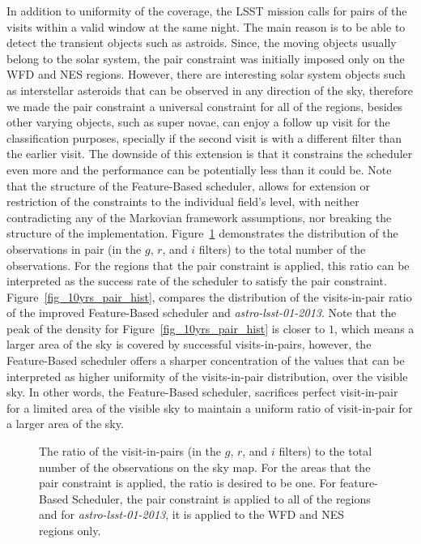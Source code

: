 \documentclass[12pt]{aastex62}
\theoremstyle{definition}
\begin{document}
In addition to uniformity of the coverage, the LSST mission calls for pairs of the visits within a valid window at the same night. The main reason is to be able to detect the transient objects such as astroids. Since, the moving objects usually belong to the solar system, the pair constraint was initially imposed only on the WFD and NES regions. However, there are interesting solar system objects such as interstellar asteroids that can be observed in any direction of the sky, therefore we made the pair constraint a universal constraint for all of the regions, besides other varying objects, such as super novae, can enjoy a follow up visit for the classification purposes, specially if the second visit is with a different filter than the earlier visit. The downside of this extension is that it constrains the scheduler even more and the performance can be potentially less than it could be. Note that the structure of the Feature-Based scheduler, allows for extension or restriction of the constraints to the individual field's level, with neither contradicting any of the Markovian framework assumptions, nor breaking the structure of the implementation. Figure~\ref{fig_10yrs_pair} demonstrates the distribution of the observations in pair (in the $g$, $r$, and $i$ filters) to the total number of the observations. For the regions that the pair constraint is applied, this ratio can be interpreted as the success rate of the scheduler to satisfy the pair constraint. Figure~\ref{fig_10yrs_pair_hist}, compares the distribution of the visits-in-pair ratio of the improved Feature-Based scheduler and \textit{astro-lsst-01-2013}. Note that the peak of the density for Figure~\ref{fig_10yrs_pair_hist} is closer to $1$, which means a larger area of the sky is covered by successful visits-in-pairs, however, the Feature-Based scheduler offers a sharper concentration of the values that can be interpreted as higher uniformity of the visits-in-pair distribution, over the visible sky. In other words, the Feature-Based scheduler, sacrifices perfect visit-in-pair for a limited area of the visible sky to maintain a uniform ratio of visit-in-pair for a larger area of the sky.

\begin{figure}[h!]
\caption{The ratio of the visit-in-pairs (in the $g$, $r$, and $i$ filters) to the total number of the observations on the sky map. For the areas that the pair constraint is applied, the ratio is desired to be one. For feature-Based Scheduler, the pair constraint is applied to all of the regions and for \textit{astro-lsst-01-2013}, it is applied to the WFD and NES regions only.}
\label{fig_10yrs_pair}
\end{figure}
\end{document}
